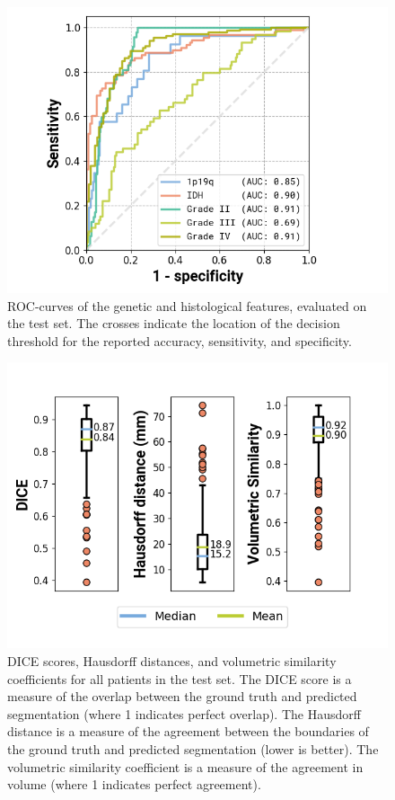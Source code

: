 \begin{figure}[htbp]
\centering
\includegraphics[width=\textwidth]{Figures/ROC.png}
\caption{\Acrfull{ROC}-curves of the genetic and histological features, evaluated on the test set. The crosses indicate the location of the decision threshold for the reported accuracy, sensitivity, and specificity.}\label{fig:roc_curves}
\end{figure}

\begin{figure}[htbp]
    \centering
    \includegraphics[width=\textwidth]{Figures/Segmentation_metrics.png}
    \caption{DICE scores, Hausdorff distances, and volumetric similarity coefficients for all patients in the test set.
    The DICE score is a measure of the overlap between the ground truth and predicted segmentation (where 1 indicates perfect overlap).
    The Hausdorff distance is a measure of the agreement between the boundaries of the ground truth and predicted segmentation (lower is better).
    The volumetric similarity coefficient is a measure of the agreement in volume (where 1 indicates perfect agreement).}\label{fig:segmentation_results}
\end{figure}

